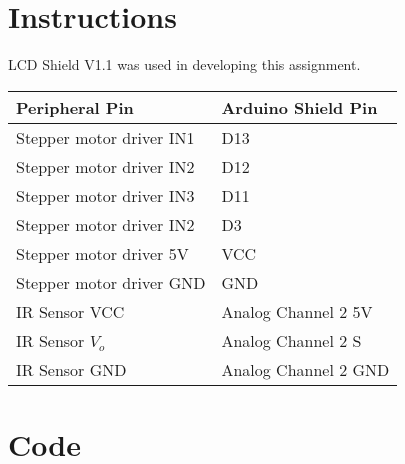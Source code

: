 \documentclass[]{article}
\begin{document}
	
	\section{Instructions}
		LCD Shield V1.1 was used in developing this assignment.
		\begin{table}[H]
			\centering
			\begin{tabular}{|l|l|}
				\hline
				\textbf{Peripheral Pin} & \textbf{Arduino Shield Pin} \\ \hline
				Stepper motor driver IN1 & D13 \\ \hline
				Stepper motor driver IN2 & D12 \\ \hline
				Stepper motor driver IN3 & D11 \\ \hline
				Stepper motor driver IN2 & D3 \\ \hline
				Stepper motor driver 5V & VCC \\ \hline
				Stepper motor driver GND & GND \\ \hline
				IR Sensor VCC & Analog Channel 2 5V \\ \hline
				IR Sensor $V_o$ & Analog Channel 2 S \\ \hline
				IR Sensor GND & Analog Channel 2 GND \\ \hline
			\end{tabular}
		\end{table}
	\section{Code}
	
\end{document}
